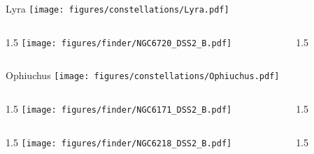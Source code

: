 \documentclass[final]{beamer}
\newlength{\colwidth}
\begin{document}

\begin{frame}[t]{\LARGE Lyra}
  \centering
  \texttt{[image: figures/constellations/Lyra.pdf]}
\end{frame}


\begin{frame}[t]{}
  \begin{columns}[T]
    \begin{column}{1.5\colwidth}
      \centering
      \texttt{[image: figures/finder/NGC6720\_DSS2\_B.pdf]}
    \end{column}
    \begin{column}{1.5\colwidth}
      \Large
      
    \end{column}
  \end{columns}
  \vspace{\fill}
\end{frame}


\begin{frame}[t]{\LARGE Ophiuchus}
  \centering
  \texttt{[image: figures/constellations/Ophiuchus.pdf]}
\end{frame}


\begin{frame}[t]{}
  \begin{columns}[T]
    \begin{column}{1.5\colwidth}
      \centering
      \texttt{[image: figures/finder/NGC6171\_DSS2\_B.pdf]}
    \end{column}
    \begin{column}{1.5\colwidth}
      \Large
      
    \end{column}
  \end{columns}
  \vspace{\fill}
  \begin{columns}[T]
    \begin{column}{1.5\colwidth}
      \centering
      \texttt{[image: figures/finder/NGC6218\_DSS2\_B.pdf]}
    \end{column}
    \begin{column}{1.5\colwidth}
      \Large
      
    \end{column}
  \end{columns}
\end{frame}
\end{document}
